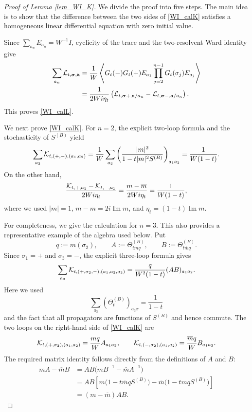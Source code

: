 \documentclass[10pt,reqno]{article}
\DeclareMathOperator{\im}{{\mathrm{Im}}}
\renewcommand{\bar}{\overline}
\theoremstyle{plain} %
\theoremstyle{remark}
\numberwithin{equation}{section}
\begin{document}
 \begin{proof}[Proof of Lemma \ref{lem_WI_K}]
We divide the proof into five steps. The main idea is to show that the
difference between the two sides of \eqref{WI_calK} satisfies a homogeneous
linear differential equation with zero initial value.

\medskip
{}

Since $\sum_{a_n}E_{a_n}=W^{-1}I$, cyclicity of the trace and the
two-resolvent Ward identity give
\begin{align*}
 \sum_{a_n}{\cal L}_{t,\boldsymbol{\sigma},\textbf{a}}
 &=
 \frac1W
 \left\langle
 G_t(-)G_t(+)
 E_{a_1}\prod_{j=2}^{n-1}G_t(\sigma_j)E_{a_j}
 \right\rangle                                                \\
 &=
 \frac{1}{2Wi\eta_t}
 \left(
 {\cal L}_{t,\boldsymbol{\sigma}+,\textbf{a}/a_n}
 -{\cal L}_{t,\boldsymbol{\sigma}-,\textbf{a}/a_n}
 \right).
\end{align*}
This proves \eqref{WI_calL}.

We next prove \eqref{WI_calK}. For $n=2$, the explicit two-loop formula and
the stochasticity of $S^{(B)}$ yield
\begin{equation}\label{hsgw2}
 \sum_{a_2}{\cal K}_{t,(+,-),(a_1,a_2)}
 =
 \frac1W\sum_{a_2}
 \left(\frac{|m|^2}{1-t|m|^2S^{(B)}}\right)_{a_1a_2}
 =\frac{1}{W(1-t)}.
\end{equation}
On the other hand,
\[
 \frac{{\cal K}_{t,+,a_1}-{\cal K}_{t,-,a_1}}{2Wi\eta_t}
 =\frac{m-\bar m}{2Wi\eta_t}
 =\frac{1}{W(1-t)},
\]
where we used $|m|=1$, $m-\bar m=2i\im m$, and
$\eta_t=(1-t)\im m$.

For completeness, we give the calculation for $n=3$. This also provides
a representative example of the algebra used below. Put
\[
 q:=m(\sigma_2),\qquad
 A:=\Theta^{(B)}_{tmq},\qquad
 B:=\Theta^{(B)}_{t\bar m q}.
\]
Since $\sigma_1=+$ and $\sigma_3=-$, the explicit three-loop formula gives
\[
 \sum_{a_3}{\cal K}_{t,(+,\sigma_2,-),(a_1,a_2,a_3)}
 =\frac{q}{W^2(1-t)}(AB)_{a_1a_2}.
\]
Here we used
\[
 \sum_{a_3}(\Theta^{(B)}_t)_{a_3x}=\frac{1}{1-t}
\]
and the fact that all propagators are functions of $S^{(B)}$ and hence
commute. The two loops on the right-hand side of \eqref{WI_calK} are
\[
 {\cal K}_{t,(+,\sigma_2),(a_1,a_2)}=\frac{mq}{W}A_{a_1a_2},
 \qquad
 {\cal K}_{t,(-,\sigma_2),(a_1,a_2)}=\frac{\bar m q}{W}B_{a_1a_2}.
\]
The required matrix identity follows directly from the definitions of
$A$ and $B$:
\begin{align*}
 mA-\bar mB
 &=AB\bigl(mB^{-1}-\bar mA^{-1}\bigr)                         \\
 &=AB\left[
 m\bigl(1-t\bar m qS^{(B)}\bigr)
 -\bar m\bigl(1-tmqS^{(B)}\bigr)
 \right]                                                       \\
 &=(m-\bar m)AB.
\end{align*}


\end{proof}
\end{document}
